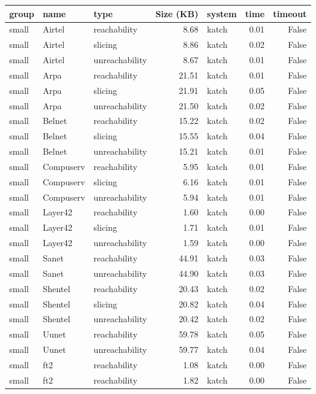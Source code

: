 \begin{tabular}{lllrlrr}
\toprule
group & name & type & Size (KB) & system & time & timeout \\
\midrule
small & Airtel & reachability & 8.68 & katch & 0.01 & False \\
small & Airtel & slicing & 8.86 & katch & 0.02 & False \\
small & Airtel & unreachability & 8.67 & katch & 0.01 & False \\
small & Arpa & reachability & 21.51 & katch & 0.01 & False \\
small & Arpa & slicing & 21.91 & katch & 0.05 & False \\
small & Arpa & unreachability & 21.50 & katch & 0.02 & False \\
small & Belnet & reachability & 15.22 & katch & 0.02 & False \\
small & Belnet & slicing & 15.55 & katch & 0.04 & False \\
small & Belnet & unreachability & 15.21 & katch & 0.01 & False \\
small & Compuserv & reachability & 5.95 & katch & 0.01 & False \\
small & Compuserv & slicing & 6.16 & katch & 0.01 & False \\
small & Compuserv & unreachability & 5.94 & katch & 0.01 & False \\
small & Layer42 & reachability & 1.60 & katch & 0.00 & False \\
small & Layer42 & slicing & 1.71 & katch & 0.01 & False \\
small & Layer42 & unreachability & 1.59 & katch & 0.00 & False \\
small & Sanet & reachability & 44.91 & katch & 0.03 & False \\
small & Sanet & unreachability & 44.90 & katch & 0.03 & False \\
small & Shentel & reachability & 20.43 & katch & 0.02 & False \\
small & Shentel & slicing & 20.82 & katch & 0.04 & False \\
small & Shentel & unreachability & 20.42 & katch & 0.02 & False \\
small & Uunet & reachability & 59.78 & katch & 0.05 & False \\
small & Uunet & unreachability & 59.77 & katch & 0.04 & False \\
small & ft2 & reachability & 1.08 & katch & 0.00 & False \\
small & ft2 & reachability & 1.82 & katch & 0.00 & False \\

\end{tabular}
